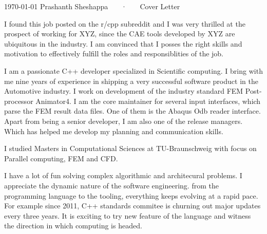 \documentclass[11pt, a4paper]{awesome-cv}
\begin{document}
\makecvheader[R]

\makecvfooter
  {\today}
  {Prashanth Sheshappa ~~~·~~~ Cover Letter}
  {}

\makelettertitle

\begin{cvletter}


I found this job posted on the r/cpp subreddit and I was very thrilled at the prospect of working for XYZ, since
the CAE tools developed by XYZ are ubiquitous in the industry. 
I am convinced that I posses the right skills and motivation to effectively fulfill the roles and responsiblities of the job.
%     

I am a passionate C++ developer specialized in Scientific computing. 
I bring with me nine years of experience in shipping a very successful software product in the Automotive industry. 
I work on development of the industry standard FEM Post-processor Animator4. 
I am the core maintainer for several input interfaces, which parse the FEM result data files. One of them is the Abaqus Odb reader interface.
Apart from being a senior developer, I am also one of the release managers. 
Which has helped me develop my planning and communication skills.

I studied Masters in Computational Sciences at TU-Braunschweig with focus on Parallel computing, FEM and CFD.

 



 



I have a lot of fun solving complex algorithmic and architecural problems. I appreciate the dynamic nature of the software engineering. from the programming language to the tooling, everything keeps evolving at a rapid pace. For example since 2011, C++ standards commitee is churning out major updates every three years. It is exciting to try new feature of the language and witness the direction in which computing is headed.




\end{cvletter}
\end{document}
